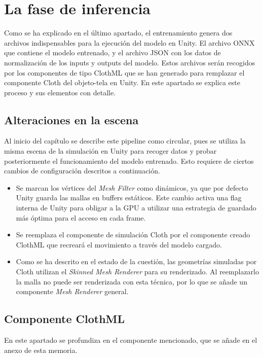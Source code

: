 \section{La fase de inferencia}
\label{sec:SimulacionUnity}

Como se ha explicado en el último apartado, el entrenamiento genera dos archivos indispensables para la ejecución del modelo en Unity. El archivo ONNX que contiene el modelo entrenado, y el archivo JSON con los datos de normalización de los inputs y outputs del modelo. Estos archivos serán recogidos por los componentes de tipo ClothML que se han generado para remplazar el componente Cloth del objeto-tela en Unity. En este apartado se explica este proceso y sus elementos con detalle.

\subsection{Alteraciones en la escena}
Al inicio del capítulo se describe este pipeline como circular, pues se utiliza la misma escena de la simulación en Unity para recoger datos y probar posteriormente el funcionamiento del modelo entrenado. Esto requiere de ciertos cambios de configuración descritos a continuación.

\begin{itemize}
    \item Se marcan los vértices del \textit{Mesh Filter} como dinámicos, ya que por defecto Unity guarda las mallas en buffers estáticos. Este cambio activa una flag interna de Unity para obligar a la GPU a utilizar una estrategia de guardado más óptima para el acceso en cada frame.
    \item Se reemplaza el componente de simulación Cloth por el componente creado ClothML que recreará el movimiento a través del modelo cargado.
    \item Como se ha descrito en el estado de la cuestión, las geometrías simuladas por Cloth utilizan el \textit{Skinned Mesh Renderer} para su renderizado. Al reemplazarlo la malla no puede ser renderizada con esta técnica, por lo que se añade un componente \textit{Mesh Renderer} general.
\end{itemize}

\subsection{Componente ClothML}

En este apartado se profundiza en el componente mencionado, que se añade en el anexo de esta memoria. %

